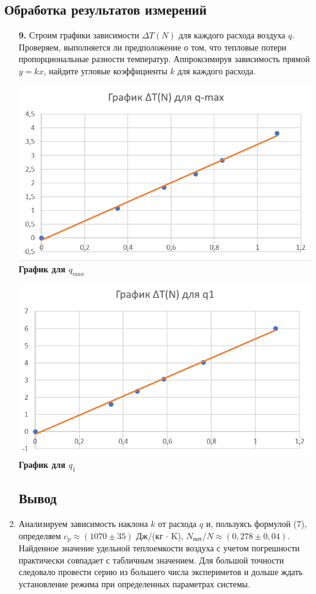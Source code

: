 \documentclass[a4paper, 12pt]{article}%
\begin{document}
\subsection*{Обработка результатов измерений}
\begin{enumerate}
\item [\textbf{9.}] Строим графики зависимости $\Delta T (N)$ для каждого расхода воздуха $q$. Проверяем, выполняется ли предположение о том, что тепловые потери пропорциональные разности температур. Аппроксимируя зависимость прямой $y = kx$, найдите угловые коэффициенты $k$ для каждого расхода.
\begin{center}
    \includegraphics[width = \textwidth]{qmax.png}
    \textbf{График для $q_{max}$}
  \end{center} 
  \begin{center} 
    \includegraphics[width = \textwidth]{q1.png}
    \textbf{График для $q_1$}
  \end{center}
\subsection*{Вывод}
\item Анализируем зависимость наклона $k$ от расхода $q$ и, пользуясь формулой (7), определяем $c_p \approx (1070 \pm 35)$ Дж/(кг $\cdot$ K), $N_{\text{пот}}/N \approx (0,278 \pm 0,04)$. Найденное значение удельной теплоемкости воздуха с учетом погрешности практически совпадает с табличным значением. Для большой точности следовало провести серию из большего числа экспериметов и дольше ждать установление режима при определенных параметрах системы.


\end{enumerate}
\end{document}
